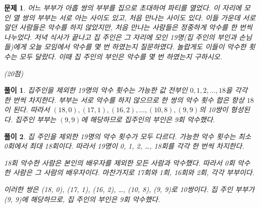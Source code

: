 \documentclass[12pt,a4paper]{article}
\theoremstyle{test_form}
\newtheorem{problem}{문제}[section]
\newtheorem*{solution}{풀이}
\begin{document}
\begin{problem}
어느 부부가 아홉 쌍의 부부를 집으로 초대하여 파티를 열었다. 이 자리에 모인 열 쌍의 부부는 서로 아는 사이도 있고, 처음 만나는 사이도 있다. 이들 가운데 서로 알던 사람들은 악수를 하지 않았지만, 처음 만나는 사람들은 정중하게 악수를 한 번씩 나누었다. 저녁 식사가 끝나고 집 주인은 그 자리에 모인 19명(집 주인의 부인과 손님들)에게 오늘 모임에서 악수를 몇 번 하였는지 질문하였다. 놀랍게도 이들이 악수한 횟수는 모두 달랐다. 이때 집 주인의 부인은 악수를 몇 번 하였는지 구하시오.
\begin{flushright}(20점)\end{flushright}
\end{problem}


\begin{solution}
    \setlength{\parindent}{0pt}
    
    집주인을 제외한 19명의 악수 횟수는 가능한 값 전부인 \(0,1,2,\dots,18\)을 각각 한 번씩 차지한다.  
    부부는 서로 악수를 하지 않으므로 한 쌍의 악수 횟수 합은 항상 \(18\)이 된다.  
    따라서 \((18,0),(17,1),(16,2),\dots,(10,8),(9,9)\)의 10쌍이 형성된다.  
    집주인 부부는 \((9,9)\)에 해당하므로 집주인의 부인은 9회 악수했다.
    
    \begin{center}
    \end{center}
    \end{solution}
    

    
\begin{solution}
\setlength{\parindent}{0pt}
집 주인을 제외한 19명의 악수 횟수가 모두 다르다. 가능한 악수 횟수는 최소 0회에서 최대 18회이다. 따라서 19명이 0, 1, 2, \ldots, 18회를 각각 한 번씩 차지한다.

18회 악수한 사람은 본인의 배우자를 제외한 모든 사람과 악수했다. 따라서 0회 악수한 사람은 그 사람의 배우자이다. 마찬가지로 17회와 1회, 16회와 2회,  각각 부부이다.

이러한 쌍은 (18, 0), (17, 1), (16, 2), \ldots, (10, 8), (9, 9)로 10쌍이다. 집 주인 부부가 (9, 9)에 해당하므로, 집 주인의 부인은 9회 악수했다.
\end{solution}
\end{document}
